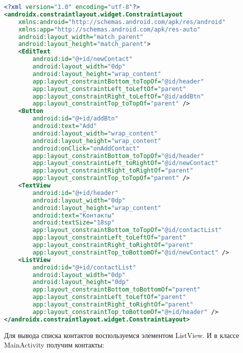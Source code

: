 \begin{lstlisting}[language=XML
	, label=lst:
	]
<?xml version="1.0" encoding="utf-8"?>
<androidx.constraintlayout.widget.ConstraintLayout
    xmlns:android="http://schemas.android.com/apk/res/android"
    xmlns:app="http://schemas.android.com/apk/res-auto"
    android:layout_width="match_parent"
    android:layout_height="match_parent">
    <EditText
        android:id="@+id/newContact"
        android:layout_width="0dp"
        android:layout_height="wrap_content"
        app:layout_constraintBottom_toTopOf="@id/header"
        app:layout_constraintLeft_toLeftOf="parent"
        app:layout_constraintRight_toLeftOf="@id/addBtn"
        app:layout_constraintTop_toTopOf="parent" />
    <Button
        android:id="@+id/addBtn"
        android:text="Add"
        android:layout_width="wrap_content"
        android:layout_height="wrap_content"
        android:onClick="onAddContact"
        app:layout_constraintBottom_toTopOf="@id/header"
        app:layout_constraintLeft_toRightOf="@id/newContact"
        app:layout_constraintRight_toRightOf="parent"
        app:layout_constraintTop_toTopOf="parent" />
    <TextView
        android:id="@+id/header"
        android:layout_width="0dp"
        android:layout_height="wrap_content"
        android:text="Контакты"
        android:textSize="18sp"
        app:layout_constraintBottom_toTopOf="@id/contactList"
        app:layout_constraintLeft_toLeftOf="parent"
        app:layout_constraintRight_toRightOf="parent"
        app:layout_constraintTop_toBottomOf="@id/newContact" />
    <ListView
        android:id="@+id/contactList"
        android:layout_width="0dp"
        android:layout_height="0dp"
        app:layout_constraintBottom_toBottomOf="parent"
        app:layout_constraintLeft_toLeftOf="parent"
        app:layout_constraintRight_toRightOf="parent"
        app:layout_constraintTop_toBottomOf="@+id/header" />
</androidx.constraintlayout.widget.ConstraintLayout>
\end{lstlisting}

Для вывода списка контактов воспользуемся элементом ListView. И в классе
MainActivity получим контакты:

